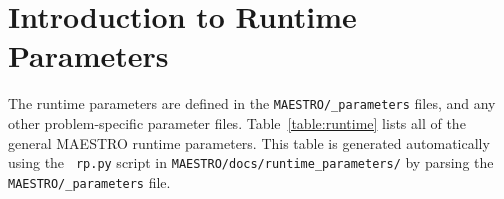 
\section{Introduction to Runtime Parameters}
\label{sec:runtime_parameters}

The runtime parameters are defined in the {\tt MAESTRO/\_parameters}
files, and any other problem-specific parameter files.
Table~\ref{table:runtime} lists all of the general MAESTRO runtime
parameters.  This table is generated automatically using the {\tt
  rp.py} script in {\tt MAESTRO/docs/runtime\_parameters/} by parsing
the {\tt MAESTRO/\_parameters} file.
